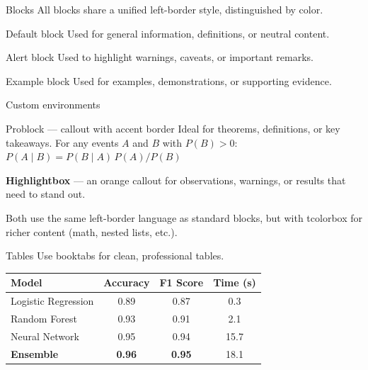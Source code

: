 \documentclass[aspectratio=169]{beamer}
\begin{document}
\begin{frame}{Blocks}
    All blocks share a unified left-border style, distinguished by color.

    \begin{block}{Default block}
        Used for general information, definitions, or neutral content.
    \end{block}

    \begin{alertblock}{Alert block}
        Used to highlight warnings, caveats, or important remarks.
    \end{alertblock}

    \begin{exampleblock}{Example block}
        Used for examples, demonstrations, or supporting evidence.
    \end{exampleblock}
\end{frame}

\begin{frame}{Custom environments}
    \begin{problock}{Problock --- callout with accent border}
        Ideal for theorems, definitions, or key takeaways.
        For any events $A$ and $B$ with $P(B) > 0$:\;
        $P(A \mid B) = {P(B \mid A)\, P(A)}/{P(B)}$
    \end{problock}

    \begin{highlightbox}
        \textbf{Highlightbox} --- an orange callout for observations,
        warnings, or results that need to stand out.
    \end{highlightbox}

    \vspace{0.2cm}
    Both use the same left-border language as standard blocks,
    but with tcolorbox for richer content (math, nested lists, etc.).
\end{frame}

\begin{frame}{Tables}
    Use booktabs for clean, professional tables.

    \vspace{0.4cm}
    \centering
    \begin{tabular}{lccc}
        \toprule
        \textbf{Model} & \textbf{Accuracy} & \textbf{F1 Score} &
        \textbf{Time (s)} \\
        \midrule
        Logistic Regression & 0.89 & 0.87 & 0.3 \\
        Random Forest       & 0.93 & 0.91 & 2.1 \\
        Neural Network      & 0.95 & 0.94 & 15.7 \\
        \textbf{Ensemble}   & \textbf{0.96} & \textbf{0.95} & 18.1 \\
        \bottomrule
    \end{tabular}
\end{frame}
\end{document}
